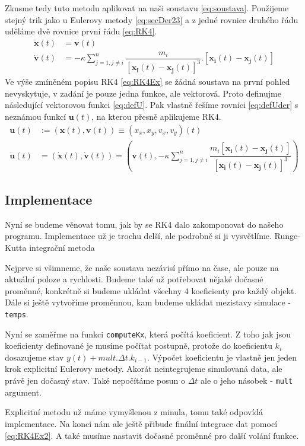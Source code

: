 Zkusme tedy tuto metodu aplikovat na naši soustavu \eqref{eq:soustava}. Použijeme stejný trik jako u Eulerovy metody \eqref{eq:secDer23} a z jedné rovnice druhého řádu uděláme dvě rovnice první řádu \eqref{eq:RK4}.
\begin{subequations}
	\label{eq:RK4}
	\begin{align}
	\label{eq:RK4pos}
	\dot{\boldsymbol{x}}(t)&=\boldsymbol{v}(t)\\
	\label{eq:RK4vel}
	\dot{\boldsymbol{v}}(t)&=-  \kappa \sum_{j=1,j \neq i}^{n}\dfrac{m_i}
	{\left[ \boldsymbol{x_i}(t) - \boldsymbol{x_j}(t)\right] ^3} . 
	\left[ \boldsymbol{x_i}(t) - \boldsymbol{x_j}(t)\right] 
	\end{align}
\end{subequations}
Ve výše zmíněném popisu RK4 \eqref{eq:RK4Ex} se žádná soustava na první pohled nevyskytuje, v zadání je pouze jedna funkce, ale vektorová. Proto definujme následující vektorovou funkci \eqref{eq:defU}. Pak vlastně řešíme rovnici \eqref{eq:defUder} s neznámou funkcí $ \boldsymbol{u}(t) $, na kterou přesně aplikujeme RK4.
\begin{align}
	\label{eq:defU}
	\boldsymbol{u}(t) &:= (\boldsymbol{x}(t),\boldsymbol{v}(t)) \equiv(x_x,x_y,v_x,v_y)(t)\\
	\label{eq:defUder}
	 \boldsymbol{\dot{u}}(t)&=(\dot{\boldsymbol{x}}(t),\dot{\boldsymbol{v}}(t))=
	 (\boldsymbol{v}(t), -\kappa \sum_{j=1,j \neq i}^{n}\dfrac{m_i\left[ \boldsymbol{x_i}(t) - \boldsymbol{x_j}(t)\right]}
	 {\left[ \boldsymbol{x_i}(t) - \boldsymbol{x_j}(t)\right] ^3}
	  )
\end{align}


\subsection{Implementace}
Nyní se budeme věnovat tomu, jak by se RK4 dalo zakomponovat do našeho programu.
Implementace už je trochu delší, ale podrobně si ji vysvětlíme.
{Runge-Kutta integrační metoda}

Nejprve si všimneme, že naše soustava nezávisí přímo na čase, ale pouze na aktuální poloze a rychlosti. Budeme také už potřebovat nějaké dočasné proměnné, konkrétně si budeme ukládat všechny 4 koeficienty pro každý objekt. Dále si ještě vytvoříme proměnnou, kam budeme ukládat mezistavy simulace - \texttt{temps}.

Nyní se zaměřme na funkci \texttt{computeKx}, která počítá koeficient. Z toho jak jsou koeficienty definované je musíme počítat postupně, protože do koeficientu $ k_i  $ dosazujeme stav $ y(t)+mult. \Delta t . k_{i-1} $.
Výpočet koeficientu je vlastně jen jeden krok explicitní Eulerovy metody. Akorát neintegrujeme simulovaná data, ale právě jen dočasný stav. Také nepočítáme posun o $ \Delta t $ ale o jeho násobek - \texttt{mult} argument.

Explicitní metodu už máme vymyšlenou z minula, tomu také odpovídá implementace.
Na konci nám ale ještě přibude finální integrace dat pomocí \eqref{eq:RK4Ex2}.
A také musíme nastavit dočasné proměnné pro další volání funkce.